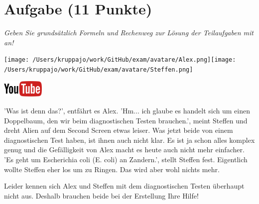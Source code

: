 \documentclass[a4paper, 9pt]{scrartcl}\usepackage[]{graphicx}\usepackage[]{xcolor}
\begin{document}
 
\clearpage

\section{Aufgabe \hfill (11 Punkte)}

\textit{Geben Sie grundsätzlich Formeln und Rechenweg zur Lösung der Teilaufgaben mit an!} \\[1Ex]
 

 
\begin{minipage}[t]{0.5\textwidth}
\texttt{[image: /Users/kruppajo/work/GitHub/exam/avatare/Alex.png]}\hspace{-4mm}\texttt{[image: /Users/kruppajo/work/GitHub/exam/avatare/Steffen.png]}
\end{minipage}
\begin{minipage}[t]{0.5\textwidth}
\hfill
\href{https://youtu.be/_7s44pbOc00}{\includegraphics[width = 2cm]{img/youtube}}
\end{minipage}
\vspace{1ex}



'Was ist denn das?', entfährt es Alex. 'Hm... ich glaube es handelt sich um einen Doppelbaum, den wir beim diagnostischen Testen brauchen.', meint Steffen und dreht Alien auf dem Second Screen etwas leiser. Was jetzt beide von einem diagnostischen Test haben, ist ihnen auch nicht klar. Es ist ja schon alles komplex genug und die Gefälligkeit von Alex macht es heute auch nicht mehr einfacher. 'Es geht um Escherichia coli (E. coli) an Zandern.', stellt Steffen fest. Eigentlich wollte Steffen eher los um zu Ringen. Das wird aber wohl nichts mehr.


Leider kennen sich Alex und Steffen mit dem diagnostischen Testen überhaupt nicht aus. Deshalb brauchen beide bei der Erstellung Ihre Hilfe! 
  
\end{document}
